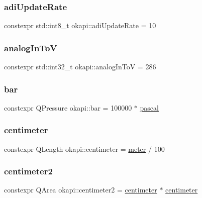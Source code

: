 \subsubsection{\texorpdfstring{adiUpdateRate}{adiUpdateRate}}
{\footnotesize\ttfamily constexpr std\+::int8\+\_\+t okapi\+::adi\+Update\+Rate = 10\hspace{0.3cm}{\ttfamily [static]}}

\mbox{\label{namespaceokapi_a2a1dadedbf4a0243e7671614e7664eb0}} 
\subsubsection{\texorpdfstring{analogInToV}{analogInToV}}
{\footnotesize\ttfamily constexpr std\+::int32\+\_\+t okapi\+::analog\+In\+ToV = 286\hspace{0.3cm}{\ttfamily [static]}}

\mbox{\label{namespaceokapi_a0b54d28853182078db748ab94cb8cd45}} 
\subsubsection{\texorpdfstring{bar}{bar}}
{\footnotesize\ttfamily constexpr Q\+Pressure okapi\+::bar = 100000 $\ast$ \mbox{\hyperlink{namespaceokapi_accda0a1a99e1aafa43e8ef14201374ad}{pascal}}}

\mbox{\label{namespaceokapi_a889129a4ecb3e93c695c8eea53b96602}} 
\subsubsection{\texorpdfstring{centimeter}{centimeter}}
{\footnotesize\ttfamily constexpr Q\+Length okapi\+::centimeter = \mbox{\hyperlink{namespaceokapi_a59563b3d4b18633f1c8d852e2932d1db}{meter}} / 100}

\mbox{\label{namespaceokapi_a9395c9d47680dc1bef1f41744f1a3a9c}} 
\subsubsection{\texorpdfstring{centimeter2}{centimeter2}}
{\footnotesize\ttfamily constexpr Q\+Area okapi\+::centimeter2 = \mbox{\hyperlink{namespaceokapi_a889129a4ecb3e93c695c8eea53b96602}{centimeter}} $\ast$ \mbox{\hyperlink{namespaceokapi_a889129a4ecb3e93c695c8eea53b96602}{centimeter}}}

